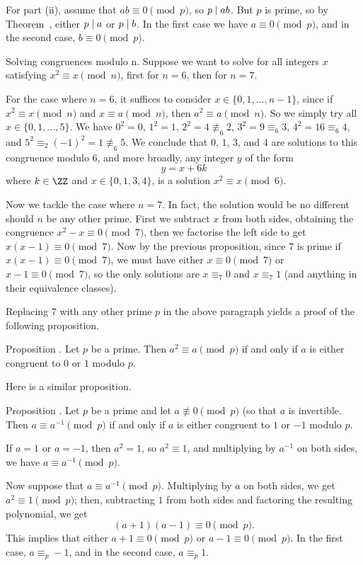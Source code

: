 For part (ii), assume that $ab\equiv 0\pmod p$, so $p\mid ab$. But $p$ is prime, so
by Theorem~{\thmpdivides}, either $p\mid a$ or $p\mid b$. In the first
case we have $a\equiv 0\pmod p$, and in the second case, $b\equiv 0\pmod p$.\slug

\medskip\boldlabel{} Solving congruences modulo {\mathbold n}.
Suppose we want to solve for all integers $x$ satisfying $x^2 \equiv x\pmod n$, first for $n=6$,
then for $n=7$.

For the case where $n=6$, it suffices to consider $x\in \{0,1,\ldots, n-1\}$,
since if $x^2\equiv x\pmod n$ and $x\equiv a\pmod n$, then $a^2\equiv a\pmod n$.
So we simply try all $x\in \{0,1,\ldots, 5\}$. We have $0^2 = 0$, $1^2 = 1$,
$2^2 = 4 \not\equiv_6 2$, $3^2 = 9\equiv_6 3$, $4^2 = 16\equiv_6 4$, and
$5^2 \equiv_2 (-1)^2 = 1\not\equiv_6 5$. We conclude that $0$, $1$, $3$, and $4$ are solutions
to this congruence modulo $6$, and more broadly, any integer $y$ of the form
$$y = x+6k$$
where $k\in \ZZ$ and $x\in \{0,1,3,4\}$, is a solution $x^2\equiv x\pmod 6$.

Now we tackle the case where $n=7$. In fact, the solution would be no different
should $n$ be any other prime.
First we subtract $x$ from both sides, obtaining the congruence $x^2 - x\equiv 0\pmod 7$,
then we factorise the left side to get $x(x-1)\equiv 0\pmod 7$. Now by the previous proposition,
since $7$ is prime if $x(x-1)\equiv 0\pmod 7$, we must have either $x\equiv 0\pmod 7$ or
$x-1\equiv 0\pmod 7$, so the only solutions are $x\equiv_7 0$ and $x\equiv_7 1$ (and anything
in their equivalence classes).

Replacing $7$ with any other prime $p$ in the above paragraph yields a proof of the following
proposition.

\proclaim Proposition \advthm. Let $p$ be a prime. Then $a^2\equiv a\pmod p$ if and only if
$a$ is either congruent to $0$ or $1$ modulo $p$.\slug

Here is a similar proposition.

\edef\propselfinversemodp{\the\thmcount}
\proclaim Proposition \advthm. Let $p$ be a prime and let $a\not\equiv 0\pmod p$ (so
that $a$ is invertible. Then $a \equiv a^{-1}\pmod p$ if and only
if $a$ is either congruent to $1$ or $-1$ modulo $p$.

\proof If $a = 1$ or $a=-1$, then $a^2 = 1$, so $a^2\equiv 1$, and multiplying by $a^{-1}$ on both sides,
we have $a\equiv a^{-1}\pmod p$.

Now suppose that $a\equiv a^{-1}\pmod p$. Multiplying by $a$ on both sides, we get $a^2\equiv 1\pmod p$;
then, subtracting $1$ from both sides and factoring the resulting polynomial, we get
$$(a+1)(a-1)\equiv 0\pmod p.$$
This implies that either $a+1\equiv 0\pmod p$ or $a-1\equiv 0\pmod p$. In the first case, $a \equiv_p -1$,
and in the second case, $a\equiv_p 1$.\slug

